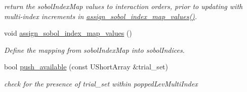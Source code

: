 \begin{DoxyCompactItemize}
\begin{DoxyCompactList}\small\item\em return the sobol\+Index\+Map values to interaction orders, prior to updating with multi-\/index increments in \hyperlink{classPecos_1_1SharedPolyApproxData_abcae46a172605a63f6c1cdaaae8d61cd}{assign\+\_\+sobol\+\_\+index\+\_\+map\+\_\+values()}. \end{DoxyCompactList}\item 
void \hyperlink{classPecos_1_1SharedPolyApproxData_abcae46a172605a63f6c1cdaaae8d61cd}{assign\+\_\+sobol\+\_\+index\+\_\+map\+\_\+values} ()\label{classPecos_1_1SharedPolyApproxData_abcae46a172605a63f6c1cdaaae8d61cd}

\begin{DoxyCompactList}\small\item\em Define the mapping from sobol\+Index\+Map into sobol\+Indices. \end{DoxyCompactList}\item 
bool \hyperlink{classPecos_1_1SharedPolyApproxData_a2ee06298e89f88df3d74e926de795ddb}{push\+\_\+available} (const U\+Short\+Array \&trial\+\_\+set)\label{classPecos_1_1SharedPolyApproxData_a2ee06298e89f88df3d74e926de795ddb}

\begin{DoxyCompactList}\small\item\em check for the presence of trial\+\_\+set within popped\+Lev\+Multi\+Index \end{DoxyCompactList}\end{DoxyCompactItemize}
